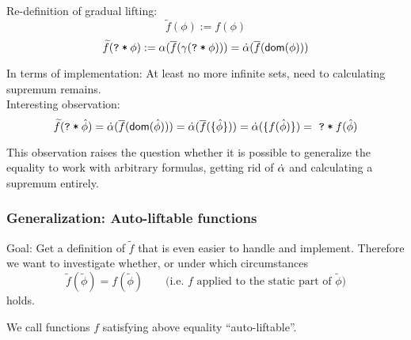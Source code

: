 \documentclass[11pt,a4paper]{article}
\newcommand{\ttt}{\texttt}
\newcommand{\predicate}{\textsf}
\newcommand{\dom}{\predicate{dom}}
\newcommand{\grad}[1]{\widetilde{#1}}
\newcommand{\qm}{\ttt{?}}
\newcommand{\withqm}[1]{\ttt{\qm\:*\:$#1$}}
\begin{document}
~\\
Re-definition of gradual lifting:
$$\grad{f}(\phi) := f(\phi)$$ 
$$\grad{f}(\withqm{\phi}) := \alpha(\overline{f}(\gamma(\withqm{\phi}))) = \dalpha(\overline{f}(\dom(\phi)))$$ 

In terms of implementation: At least no more infinite sets, need to calculating supremum remains.\\

Interesting observation:
$$\grad{f}(\withqm{\hat{\phi}}) = \dalpha(\overline{f}(\dom(\hat{\phi}))) = \dalpha(\overline{f}(\{ \hat{\phi} \})) = \dalpha(\{ f(\hat{\phi}) \}) = \,\,\withqm{f(\hat{\phi})}$$

This observation raises the question whether it is possible to generalize the equality to work with arbitrary formulas, getting rid of $\dot{\alpha}$ and calculating a supremum entirely.




\subsubsection{Generalization: Auto-liftable functions}
Goal:
Get a definition of $\grad{f}$ that is even easier to handle and implement.
Therefore we want to investigate whether, or under which circumstances 
$$\grad{f}(\grad{\phi}) = f(\grad{\phi}) \quad\quad\text{(i.e. $f$ applied to the static part of $\grad{\phi}$)}$$
holds.

We call functions $f$ satisfying above equality “auto-liftable”.

\end{document}
